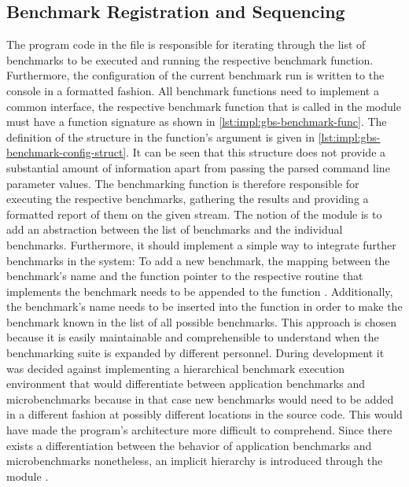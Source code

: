 \subsection{Benchmark Registration and Sequencing}
\label{ssec:impl:arch:gbs-benchmark}

The program code in the file  is responsible for iterating through the list of benchmarks to be executed and running the respective benchmark function. Furthermore, the configuration of the current benchmark run is written to the console in a formatted fashion. All benchmark functions need to implement a common interface, \ie the respective benchmark function that is called in the  module must have a function signature as shown in \autoref{lst:impl:gbs-benchmark-func}. The definition of the structure in the function's argument is given in \autoref{lst:impl:gbs-benchmark-config-struct}. It can be seen that this structure does not provide a substantial amount of information apart from passing the parsed command line parameter values. The benchmarking function is therefore responsible for executing the respective benchmarks, gathering the results and providing a formatted report of them on the given stream. The notion of the  module is to add an abstraction between the list of benchmarks and the individual benchmarks. Furthermore, it should implement a simple way to integrate further benchmarks in the system: To add a new benchmark, the mapping between the benchmark's name and the function pointer to the respective routine that implements the benchmark needs to be appended to the function . Additionally, the benchmark's name needs to be inserted into the function  in order to make the benchmark known in the list of all possible benchmarks. This approach is chosen because it is easily maintainable and comprehensible to understand when the benchmarking suite is expanded by different personnel. During development it was decided against implementing a hierarchical benchmark execution environment that would differentiate between application benchmarks and microbenchmarks because in that case new benchmarks would need to be added in a different fashion at possibly different locations in the source code. This would have made the program's architecture more difficult to comprehend. Since there exists a differentiation between the behavior of application benchmarks and microbenchmarks nonetheless, an implicit hierarchy is introduced through the module .

